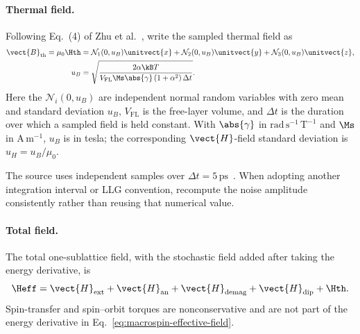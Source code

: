 \paragraph{Thermal field.}
Following Eq.~(4) of Zhu et al.~\cite{zhu2019voltage}, write the sampled
thermal field as
\begin{align}
    \vect{B}_{\mathrm{th}}
    =\mu_0\Hth
     & =\mathcal{N}_1(0,u_B)\unitvect{x}
    +\mathcal{N}_2(0,u_B)\unitvect{y}
    +\mathcal{N}_3(0,u_B)\unitvect{z},
    \label{eq:thermal-field-discrete}              \\
    u_B
     & =\sqrt{\frac{2\alpha\kB T}
            {V_{\mathrm{FL}}\Ms\abs{\gamma}
                \left(1+\alpha^2\right)\Delta t}}.
    \label{eq:thermal-field-standard-deviation}
\end{align}
Here the $\mathcal{N}_i(0,u_B)$ are independent normal random variables with
zero mean and standard deviation $u_B$, $V_{\mathrm{FL}}$ is the free-layer
volume, and $\Delta t$ is the duration over which a sampled field is held
constant.  With $\abs{\gamma}$ in $\mathrm{rad\,s^{-1}\,T^{-1}}$ and $\Ms$ in
$\mathrm{A\,m^{-1}}$, $u_B$ is in tesla; the corresponding $\vect{H}$-field
standard deviation is $u_H=u_B/\mu_0$.

The source uses independent samples over
$\Delta t=5\,\mathrm{ps}$~\cite{zhu2019voltage}.  When adopting another
integration interval or LLG convention, recompute the noise amplitude
consistently rather than reusing that numerical value.

\paragraph{Total field.}
The total one-sublattice field, with the stochastic field added after taking
the energy derivative, is~\cite{ode-llg-code}
\begin{equation}
    \Heff
    =\vect{H}_{\mathrm{ext}}
    +\vect{H}_{\mathrm{an}}
    +\vect{H}_{\mathrm{demag}}
    +\vect{H}_{\mathrm{dip}}
    +\Hth.
    \label{eq:one-sublattice-total-field}
\end{equation}
Spin-transfer and spin--orbit torques are nonconservative and are not part of
the energy derivative in Eq.~\eqref{eq:macrospin-effective-field}.

